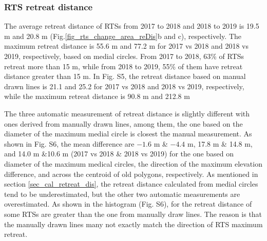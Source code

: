 \documentclass[authoryear,preprint,review,12pt]{elsarticle}
\begin{document}


\subsubsection{RTS retreat distance}
\label{sec_rts_retreat_distance}

The average retreat distance of RTSs from 2017 to 2018 and 2018 to 2019 is 19.5 m and 20.8 m (Fig.\ref{fig_rts_change_area_reDis}b and c), respectively. 
The maximum retreat distance is 55.6 m and 77.2 m for 2017 vs 2018 and 2018 vs 2019, respectively, based on medial circles. 
From 2017 to 2018, 63\% of RTSs retreat more than 15 m, while from 2018 to 2019, 55\% of them have retreat distance greater than 15 m. 
In Fig. S5, the retreat distance based on manual drawn lines is 21.1 and 25.2 for 2017 vs 2018 and 2018 vs 2019, respectively, while the maximum retreat distance is 90.8 m and 212.8 m

The three automatic measurement of retreat distance is slightly different with ones derived from manually drawn lines, among them, the one based on the diameter of the maximum medial circle is closest the manual measurement. 
As shown in Fig. S6, the mean difference are $-1.6$ m \& $-4.4$ m, 17.8 m \& 14.8 m, and 14.0 m \&10.6 m (2017 vs 2018 \& 2018 vs 2019) for the one based on diameter of the maximum medical circles, the direction of the maximum elevation difference, and across the centroid of old polygons, respectively. 
As mentioned in section \ref{sec_cal_retreat_dis}, the retreat distance calculated from medial circles tend to be underestimated, but the other two automatic measurements are overestimated. 
As shown in the histogram (Fig. S6), for the retreat distance of some RTSs are greater than the one from manually draw lines. 
The reason is that the manually drawn lines many not exactly match the direction of RTS maximum retreat.  
\end{document}
